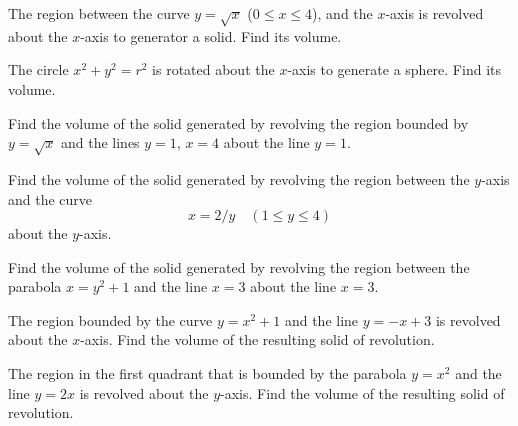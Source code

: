 \begin{example}
The region between the curve $y=\sqrt x$ ($0\le x\le 4$), and the $x$-axis is revolved about the $x$-axis to generator a solid.
Find its volume.
\end{example}

\newpage

\begin{example}
The circle $x^2+y^2=r^2$ is rotated about the $x$-axis to generate a sphere.
Find its volume.
\end{example}

\newpage

\begin{example}
Find the volume of the solid generated by revolving the region bounded by $y=\sqrt x$ and the lines $y=1$, $x=4$ about the line $y=1$.
\end{example}

\newpage

\begin{example}
Find the volume of the solid generated by revolving the region between the $y$-axis and the curve 
\begin{equation*}
x=2/y\quad (1\le y\le 4)
\end{equation*}
about the $y$-axis.
\end{example}

\newpage

\begin{example}
Find the volume of the solid generated by revolving the region between the parabola $x=y^2+1$ and the line $x=3$ about the line $x=3$.
\end{example}

\newpage

\begin{example}
The region bounded by the curve $y=x^2+1$ and the line $y=-x+3$ is revolved about the $x$-axis.
Find the volume of the resulting solid of revolution.
\end{example}

\newpage

\begin{example}
The region in the first quadrant that is bounded by the parabola $y=x^2$ and the line $y=2x$ is revolved about the $y$-axis.  
Find the volume of the resulting solid of revolution.
\end{example}
